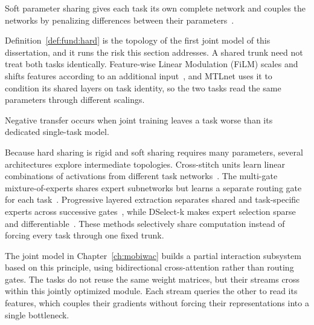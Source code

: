 \begin{definition}\label{def:fund:soft}
    Soft parameter sharing gives each task its own complete network and couples the
    networks by penalizing differences between their
    parameters~\cite{ruder2017mtloverview}.
\end{definition}

Definition~\ref{def:fund:hard} is the topology of the first joint model of this
dissertation, and it runs the risk this section addresses. A shared trunk need not
treat both tasks identically. Feature-wise Linear Modulation (FiLM) scales and shifts
features according to an additional input~\cite{perez2018film}, and MTLnet uses it to
condition its shared layers on task identity, so the two tasks read the same
parameters through different scalings.

\begin{definition}\label{def:fund:negtransfer}
    Negative transfer occurs when joint training leaves a task worse than its dedicated
    single-task model.
\end{definition}

Because hard sharing is rigid and soft sharing requires many parameters, several
architectures explore intermediate topologies. Cross-stitch units learn linear
combinations of activations from different task networks~\cite{misra2016cross}.
The multi-gate mixture-of-experts shares expert subnetworks but learns a
separate routing gate for each task~\cite{ma2018mmoe}. Progressive layered
extraction separates shared and task-specific experts across successive
gates~\cite{tang2020ple}, while DSelect-k makes expert selection sparse and
differentiable~\cite{hazimeh2021dselectk}. These methods selectively share
computation instead of forcing every task through one fixed trunk.

The joint model in Chapter~\ref{ch:mobiwac} builds a partial interaction
subsystem based on this principle, using bidirectional cross-attention rather than
routing gates. The tasks do not reuse the same weight matrices, but their streams
cross within this jointly optimized module. Each stream queries the other to read its
features, which couples their gradients without forcing their representations into a
single bottleneck.

